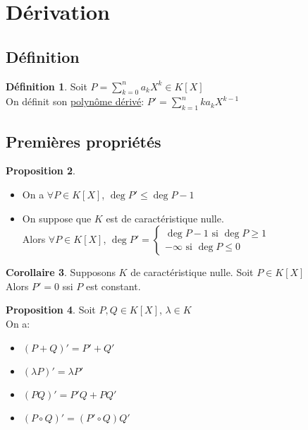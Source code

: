 \documentclass[10pt,a4paper]{article}
\theoremstyle{definition}
\newtheorem{proposition}{Proposition}[section]
\newtheorem{corollaire}[proposition]{Corollaire}
\newtheorem{definition}[proposition]{Définition}
\begin{document}
\section{Dérivation}
\subsection{Définition}
\begin{definition}
Soit $P = \sum\limits_{k = 0}^n a_k X^k \in K[X]$ \\
On définit son \uline{polynôme dérivé}: $P' = \sum\limits_{k = 1}^n k a_k X^{k - 1}$
\end{definition}

\subsection{Premières propriétés}
\begin{proposition}
\hfill
\begin{itemize}
\item On a $\forall P \in K[X]$, $\deg P' \leq \deg P - 1$
\item On suppose que $K$ est de caractéristique nulle. \\
Alors $\forall P \in K[X]$, $\deg P' = \begin{cases}
\deg P - 1 \text{ si } \deg P \geq 1 \\
-\infty \text{ si } \deg P \leq 0
\end{cases}$
\end{itemize}
\end{proposition}
\begin{corollaire}
Supposons $K$ de caractéristique nulle. Soit $P \in K[X]$ \\
Alors $P' = 0$ ssi $P$ est constant.
\end{corollaire}
\begin{proposition}
Soit $P, Q \in K[X]$, $\lambda \in K$ \\
On a:
\begin{itemize}
\item $(P + Q)' = P' + Q'$
\item $(\lambda P)' = \lambda P'$
\item $(PQ)' = P'Q + PQ'$
\item $(P \circ Q)' = (P' \circ Q) Q'$
\end{itemize}
\end{proposition}
\end{document}

